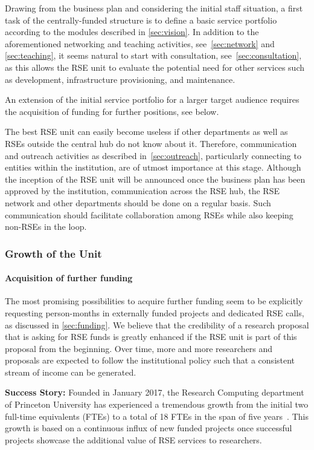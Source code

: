\documentclass[a4paper]{article}
\begin{document}
Drawing from the business plan and considering the initial staff situation, a first task of the centrally-funded structure is to define a basic service portfolio according to the modules described in \autoref{sec:vision}.
In addition to the aforementioned networking and teaching activities, see~\autoref{sec:network} and \autoref{sec:teaching}, it seems natural to start with consultation, see~\autoref{sec:consultation},
  as this allows the RSE unit to evaluate the potential need for other services such as development, infrastructure provisioning, and maintenance.

An extension of the initial service portfolio for a larger target audience requires the acquisition of funding for further positions, see below.

The best RSE unit can easily become useless if other departments as well as RSEs outside the central hub do not know about it.
Therefore, communication and outreach activities as described in~\autoref{sec:outreach}, particularly connecting to entities within the institution, are of utmost importance at this stage.
Although the inception of the RSE unit will be announced once the business plan has been approved by the institution, communication across the RSE hub, the RSE network and other departments should be done on a regular basis.
Such communication should facilitate collaboration among RSEs while also keeping non-RSEs in the loop.


\subsubsection{Growth of the Unit}

\paragraph{Acquisition of further funding}
The most promising possibilities to acquire further funding seem to be explicitly requesting person-months in externally funded projects and dedicated RSE calls, as discussed in \autoref{sec:funding}.
We believe that the credibility of a research proposal that is asking for RSE funds is greatly enhanced if the RSE unit is part of this proposal from the beginning.
Over time, more and more researchers and proposals are expected to follow the institutional policy such that a consistent stream of income can be generated.

\begin{mdframed}
\textbf{Success Story:} Founded in January 2017, the Research Computing department of Princeton University has experienced a tremendous growth from the initial two full-time equivalents (FTEs) to a total of 18 FTEs in the span of five years~\autocite{Cosden2022a}.
This growth is based on a continuous influx of new funded projects once successful projects showcase the additional value of RSE services to researchers.
\end{mdframed}
\end{document}
